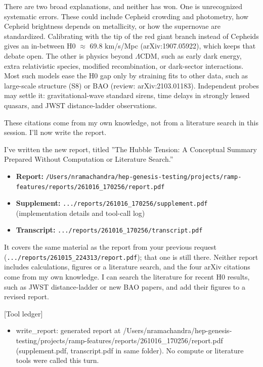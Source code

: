 \documentclass[11pt,a4paper]{article}
\begin{document}
There are two broad explanations, and neither has won. One is unrecognized systematic errors. These could include Cepheid crowding and photometry, how Cepheid brightness depends on metallicity, or how the supernovae are standardized. Calibrating with the tip of the red giant branch instead of Cepheids gives an in-between H0 $\approx$ 69.8 km/s/Mpc (arXiv:1907.05922), which keeps that debate open. The other is physics beyond $\Lambda$CDM, such as early dark energy, extra relativistic species, modified recombination, or dark-sector interactions. Most such models ease the H0 gap only by straining fits to other data, such as large-scale structure (S8) or BAO (review: arXiv:2103.01183). Independent probes may settle it: gravitational-wave standard sirens, time delays in strongly lensed quasars, and JWST distance-ladder observations.

These citations come from my own knowledge, not from a literature search in this session. I'll now write the report.

I've written the new report, titled ''The Hubble Tension: A Conceptual Summary Prepared Without Computation or Literature Search.''

\begin{itemize}
  \item \textbf{Report:} \texttt{/\allowbreak{}Users/\allowbreak{}nramachandra/\allowbreak{}hep-genesis-testing/\allowbreak{}projects/\allowbreak{}ramp-features/\allowbreak{}reports/\allowbreak{}261016\_\allowbreak{}170256/\allowbreak{}report.pdf}
  \item \textbf{Supplement:} \texttt{.../\allowbreak{}reports/\allowbreak{}261016\_\allowbreak{}170256/\allowbreak{}supplement.pdf} (implementation details and tool-call log)
  \item \textbf{Transcript:} \texttt{.../\allowbreak{}reports/\allowbreak{}261016\_\allowbreak{}170256/\allowbreak{}transcript.pdf}
\end{itemize}
It covers the same material as the report from your previous request (\texttt{.../\allowbreak{}reports/\allowbreak{}261015\_\allowbreak{}224313/\allowbreak{}report.pdf}); that one is still there. Neither report includes calculations, figures or a literature search, and the four arXiv citations come from my own knowledge. I can search the literature for recent H0 results, such as JWST distance-ladder or new BAO papers, and add their figures to a revised report.

[Tool ledger]

\begin{itemize}
  \item write\_report: generated report at /Users/nramachandra/hep-genesis-testing/projects/ramp-features/reports/261016\_170256/report.pdf (supplement.pdf, transcript.pdf in same folder). No compute or literature tools were called this turn.
\end{itemize}
\end{document}
